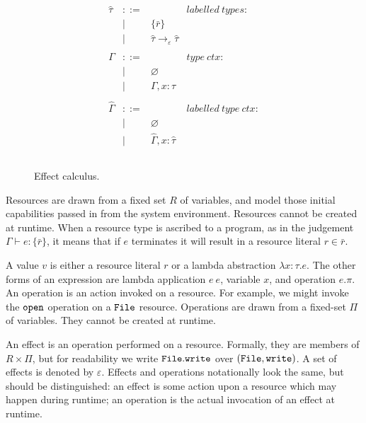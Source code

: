 \begin{figure}[h]
\[\begin{array}{lll}
\begin{array}{lllr}
\hat \tau & ::= & ~ & labelled ~types: \\
		& | & \{ \bar r \} \\
		& | & \hat \tau \rightarrow_{\varepsilon} \hat \tau \\
		&&\\

\Gamma & ::= & ~ & type~ctx: \\
				& | & \varnothing \\
				& | & \Gamma, x: \tau \\
				&&\\
				
\hat \Gamma & ::= & ~ & labelled~type~ctx:\\
				& | & \varnothing \\
				& | & \hat \Gamma, x: \hat \tau \\
				&&\\

\end{array}

\end{array}
\]

\vspace{-7pt}
\caption{Effect calculus.}
\label{This is the label.}
\end{figure}

Resources are drawn from a fixed set $R$ of variables, and model those initial capabilities passed in from the system environment. Resources cannot be created at runtime. When a resource type is ascribed to a program, as in the judgement $\Gamma \vdash e: \{ \bar r \}$, it means that if $e$ terminates it will result in a resource literal $r \in \bar r$.

A value $v$ is either a resource literal $r$ or a lambda abstraction $\lambda x: \tau.e$. The other forms of an expression are lambda application $e~e$, variable $x$, and operation $e.\pi$. An operation is an action invoked on a resource. For example, we might invoke the $\mathtt{open}$ operation on a $\mathtt{File}$ resource. Operations are drawn from a fixed-set $\Pi$ of variables. They cannot be created at runtime.

An effect is an operation performed on a resource. Formally, they are members of $R \times \Pi$, but for readability we write $\mathtt{File.write}$ over $\mathtt{(File, write)}$. A set of effects is denoted by $\varepsilon$. Effects and operations notationally look the same, but should be distinguished: an effect is some action upon a resource which may happen during runtime; an operation is the actual invocation of an effect at runtime.

